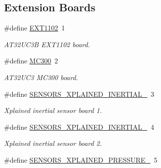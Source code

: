 \subsection*{Extension Boards}
\begin{DoxyCompactItemize}
\item 
\hypertarget{group__group__common__boards_gac0e7416ec00004a707cf2d27ad58cb3d}{\#define \hyperlink{group__group__common__boards_gac0e7416ec00004a707cf2d27ad58cb3d}{E\-X\-T1102}~1}\label{group__group__common__boards_gac0e7416ec00004a707cf2d27ad58cb3d}

\begin{DoxyCompactList}\small\item\em A\-T32\-U\-C3\-B E\-X\-T1102 board. \end{DoxyCompactList}\item 
\hypertarget{group__group__common__boards_gace61944bcb2fb68401c2706a769fd03e}{\#define \hyperlink{group__group__common__boards_gace61944bcb2fb68401c2706a769fd03e}{M\-C300}~2}\label{group__group__common__boards_gace61944bcb2fb68401c2706a769fd03e}

\begin{DoxyCompactList}\small\item\em A\-T32\-U\-C3 M\-C300 board. \end{DoxyCompactList}\item 
\hypertarget{group__group__common__boards_gab00de293d88d2d5b7abbd20fabf3640b}{\#define \hyperlink{group__group__common__boards_gab00de293d88d2d5b7abbd20fabf3640b}{S\-E\-N\-S\-O\-R\-S\-\_\-\-X\-P\-L\-A\-I\-N\-E\-D\-\_\-\-I\-N\-E\-R\-T\-I\-A\-L\-\_}~3}\label{group__group__common__boards_gab00de293d88d2d5b7abbd20fabf3640b}

\begin{DoxyCompactList}\small\item\em Xplained inertial sensor board 1. \end{DoxyCompactList}\item 
\hypertarget{group__group__common__boards_gaa9549edc14a78c1600acf49e44b9c5ac}{\#define \hyperlink{group__group__common__boards_gaa9549edc14a78c1600acf49e44b9c5ac}{S\-E\-N\-S\-O\-R\-S\-\_\-\-X\-P\-L\-A\-I\-N\-E\-D\-\_\-\-I\-N\-E\-R\-T\-I\-A\-L\-\_}~4}\label{group__group__common__boards_gaa9549edc14a78c1600acf49e44b9c5ac}

\begin{DoxyCompactList}\small\item\em Xplained inertial sensor board 2. \end{DoxyCompactList}\item 
\hypertarget{group__group__common__boards_ga6d24ad0b78a00ebea03fc2b263e0735b}{\#define \hyperlink{group__group__common__boards_ga6d24ad0b78a00ebea03fc2b263e0735b}{S\-E\-N\-S\-O\-R\-S\-\_\-\-X\-P\-L\-A\-I\-N\-E\-D\-\_\-\-P\-R\-E\-S\-S\-U\-R\-E\-\_}~5}\label{group__group__common__boards_ga6d24ad0b78a00ebea03fc2b263e0735b}


\end{DoxyCompactItemize}
